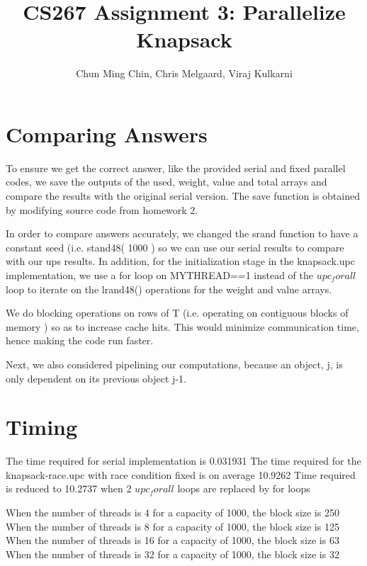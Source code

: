 \documentclass[11pt]{amsart}
\title{CS267 Assignment 3: Parallelize Knapsack}
\author{Chun Ming Chin, Chris Melgaard, Viraj Kulkarni }
\begin{document}
\maketitle




\section{Comparing Answers}

To ensure we get the correct answer, like the provided serial and fixed parallel codes, we save the outputs of the used, weight, value and total arrays and compare the results with the original serial version. The save function is obtained by modifying source code from homework 2.

In order to compare answers accurately, we changed the srand function to have a constant seed (i.e. stand48( 1000 ) so we can use our serial results to compare with our ups results. In addition, for the initialization stage in the knapsack.upc implementation, we use a for loop on MYTHREAD==1 instead of the $upc_forall$ loop to iterate on the lrand48() operations for the weight and value arrays. 

We do blocking operations on rows of T (i.e. operating on contiguous blocks of memory )  so as to increase cache hits. This would minimize communication time, hence making the code run faster. 

Next, we also considered pipelining our computations, because an object, j, is only dependent on its previous object j-1.

\section{Timing}

The time required for serial implementation is 0.031931
The time required for the knapsack-race.upc with race condition fixed is on average 10.9262
Time required is reduced to 10.2737 when 2 $upc_forall$ loops are replaced by for loops 

When the number of threads is 4 for a capacity of 1000, the block size is 250
When the number of threads is 8 for a capacity of 1000, the block size is 125
When the number of threads is 16 for a capacity of 1000, the block size is 63
When the number of threads is 32 for a capacity of 1000, the block size is 32
\end{document}
